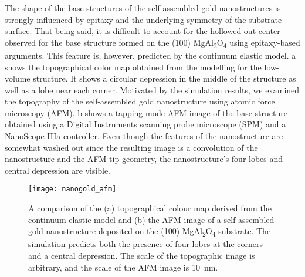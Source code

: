 The shape of the base structures of the self-assembled gold nanostructures is strongly influenced by epitaxy and the underlying symmetry of the substrate surface.
That being said, it is difficult to account for the hollowed-out center observed for the base structure formed on the (100) MgAl\textsubscript{2}O\textsubscript{4} using epitaxy-based arguments.
This feature is, however, predicted by the continuum elastic model.
a shows the topographical color map obtained from the modelling for the low-volume structure.
It shows a circular depression in the middle of the structure as well as a lobe near each corner.
Motivated by the simulation results, we examined the topography of the self-assembled gold nanostructure using atomic force microscopy (AFM).
b shows a tapping mode AFM image of the base structure obtained using a Digital Instruments scanning probe microscope (SPM) and a NanoScope IIIa controller.
Even though the features of the nanostructure are somewhat washed out since the resulting image is a convolution of the nanostructure and the AFM tip geometry, the nanostructure's four lobes and central depression are visible.
\begin{figure}
 \centering
 \texttt{[image: nanogold\_afm]}
 \caption[Comparison of AFM and simulated gold nanostructure topography]{\label{fig:nanogold_afm}A comparison of the (a) topographical colour map derived from the continuum elastic model and (b) the AFM image of a self-assembled gold nanostructure deposited on the (100) MgAl\textsubscript{2}O\textsubscript{4} substrate.
  The simulation predicts both the presence of four lobes at the corners and a central depression.
  The scale of the topographic image is arbitrary, and the scale of the AFM image is 10~nm.}
\end{figure}

